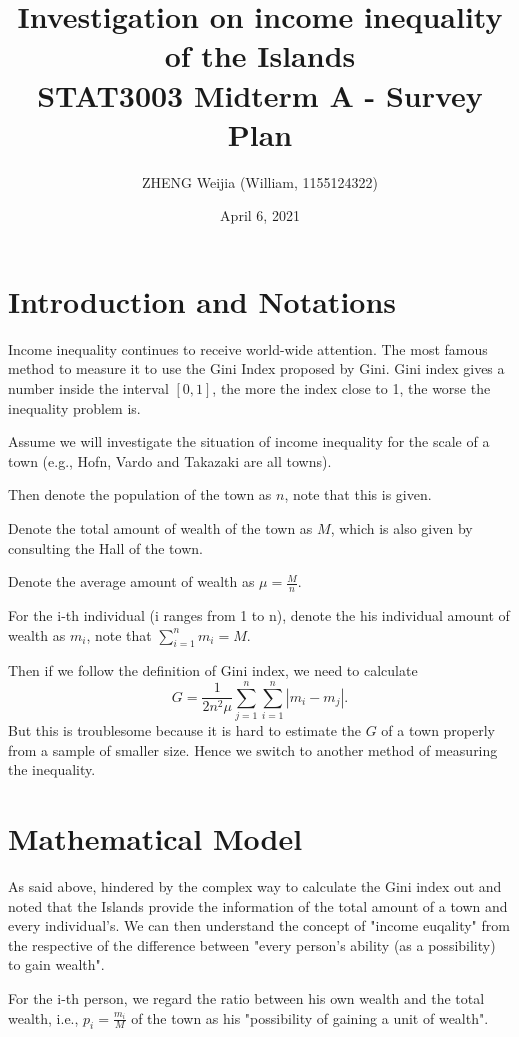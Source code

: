 \documentclass[12pt]{article}%
\begin{document}
\title{Investigation on income inequality of the Islands\\
\Large STAT3003 Midterm A - Survey Plan}
\author{ZHENG Weijia (William, 1155124322)}
\date{April 6, 2021}
\maketitle



\section{Introduction and Notations}
Income inequality continues to receive world-wide attention. The most famous method to measure it to use the Gini Index proposed by Gini. 
Gini index gives a number inside the interval $[0,1]$, the more the index close to 1, the worse the inequality problem is.

Assume we will investigate the situation of income inequality for the scale of a town (e.g., Hofn, Vardo and Takazaki are all towns).

Then denote the population of the town as $n$, note that this is given.

Denote the total amount of wealth of the town as $M$, which is also given by consulting the Hall of the town.

Denote the average amount of wealth as $\mu = \frac{M}{n}$.

For the i-th individual (i ranges from 1 to n), denote the his individual amount of wealth as $m_i$, note that $\sum_{i=1}^{n}m_i=M.$

Then if we follow the definition of Gini index, we need to calculate $$G=\frac{1}{2n^2\mu}\sum_{j=1}^{n}\sum_{i=1}^{n}|m_i-m_j|.$$
But this is troublesome because it is hard to estimate the $G$ of a town properly from a sample of smaller size. 
Hence we switch to another method of measuring the inequality.


\section{Mathematical Model}
As said above, hindered by the complex way to calculate the Gini index out and noted that the Islands provide the information of the total amount of a town and every individual's. 
We can then understand the concept of "income euqality" from the respective of the difference between "every person's ability (as a possibility) to gain wealth".

For the i-th person, we regard the ratio between his own wealth and the total wealth, i.e., $p_i=\frac{m_i}{M}$ of the town as his "possibility of gaining a unit of wealth".
\end{document}
